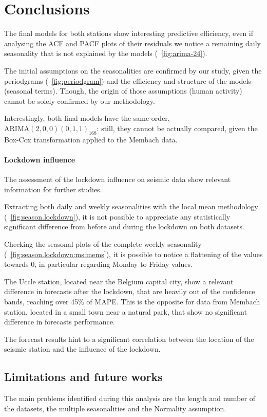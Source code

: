 \documentclass[12pt]{article}
\begin{document}
\section{Conclusions}
The final models for both stations show interesting predictive efficiency, even if analysing the ACF and PACF plots of their residuals we notice a remaining daily seasonality that is not explained by the models (\figurename~\ref{fig:arima-24}).

The initial assumptions on the seasonalities are confirmed by our study, given the periodgrams (\figurename~\ref{fig:periodgram}) and the efficiency and structure of the models (seasonal terms). Though, the origin of those assumptions (human activity) cannot be solely confirmed by our methodology.

Interestingly, both final models have the same order, $\mathrm{ARIMA}(2,0,0)(0,1,1)_{168}$: still, they cannot be actually compared, given the Box-Cox transformation applied to the Membach data.

\paragraph{Lockdown influence} The assessment of the lockdown influence on seismic data show relevant information for further studies.

Extracting both daily and weekly seasonalities with the local mean methodology (\figurename~\ref{fig:season.lockdown}), it is not possible to appreciate any statistically significant difference from before and during the lockdown on both datasets.

Checking the seasonal plots of the complete weekly seasonality (\figurename~\ref{fig:season.lockdown:ms:mems}), it is possible to notice a flattening of the values towards 0, in particular regarding Monday to Friday values.

The Uccle station, located near the Belgium capital city, show a relevant difference in forecasts after the lockdown, that are heavily out of the confidence bands, reaching over 45\% of MAPE. This is the opposite for data from Membach station, located in a small town near a natural park, that show no significant difference in forecasts performance.

The forecast results hint to a significant correlation between the location of the seismic station and the influence of the lockdown.

\subsection{Limitations and future works}
The main problems identified during this analysis are the length and number of the datasets, the multiple seasonalities and the Normality assumption.
\end{document}

